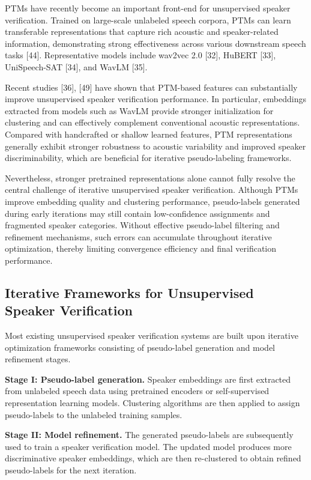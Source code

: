 \documentclass[lettersize,journal]{IEEEtran}
\begin{document}
PTMs have recently become an important front-end for unsupervised speaker verification. Trained on large-scale unlabeled speech corpora, PTMs can learn transferable representations that capture rich acoustic and speaker-related information, demonstrating strong effectiveness across various downstream speech tasks [44]. Representative models include wav2vec 2.0 [32], HuBERT [33], UniSpeech-SAT [34], and WavLM [35].

Recent studies [36], [49] have shown that PTM-based features can substantially improve unsupervised speaker verification performance. In particular, embeddings extracted from models such as WavLM provide stronger initialization for clustering and can effectively complement conventional acoustic representations. Compared with handcrafted or shallow learned features, PTM representations generally exhibit stronger robustness to acoustic variability and improved speaker discriminability, which are beneficial for iterative pseudo-labeling frameworks.

Nevertheless, stronger pretrained representations alone cannot fully resolve the central challenge of iterative unsupervised speaker verification. Although PTMs improve embedding quality and clustering performance, pseudo-labels generated during early iterations may still contain low-confidence assignments and fragmented speaker categories. Without effective pseudo-label filtering and refinement mechanisms, such errors can accumulate throughout iterative optimization, thereby limiting convergence efficiency and final verification performance.

\subsection{Iterative Frameworks for Unsupervised Speaker Verification}

Most existing unsupervised speaker verification systems are built upon iterative optimization frameworks consisting of pseudo-label generation and model refinement stages.

\textbf{Stage I: Pseudo-label generation.}
Speaker embeddings are first extracted from unlabeled speech data using pretrained encoders or self-supervised representation learning models. Clustering algorithms are then applied to assign pseudo-labels to the unlabeled training samples.

\textbf{Stage II: Model refinement.}
The generated pseudo-labels are subsequently used to train a speaker verification model. The updated model produces more discriminative speaker embeddings, which are then re-clustered to obtain refined pseudo-labels for the next iteration.
\end{document}
